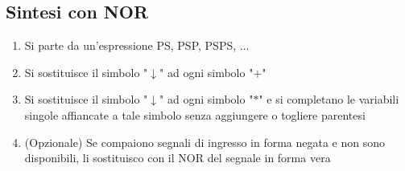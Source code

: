 \documentclass{article}
\begin{document}
\subsection{Sintesi con NOR}

\begin{enumerate}
    \item Si parte da un’espressione PS, PSP, PSPS, $\dots$
    \item Si sostituisce il simbolo "$\downarrow$" ad ogni simbolo "$+$"
    \item Si sostituisce il simbolo "$\downarrow$" ad ogni simbolo "$*$" e si completano le variabili singole affiancate a tale simbolo senza aggiungere o togliere parentesi
    \item (Opzionale) Se compaiono segnali di ingresso in forma negata e non sono disponibili, li sostituisco con il NOR del segnale in forma vera
\end{enumerate}
\end{document}
